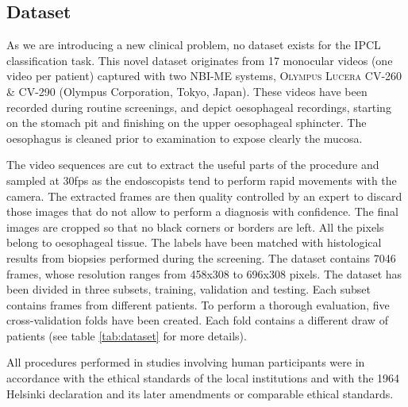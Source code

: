 \documentclass[runningheads]{llncs}
\begin{document}
\subsection{Dataset}

As we are introducing a new clinical problem, no dataset exists for the IPCL classification task. This novel dataset originates from 17 monocular videos (one video per patient) captured with two NBI-ME systems, \textsc{Olympus Lucera CV-260 \& CV-290} (Olympus Corporation, Tokyo, Japan). These videos have been recorded during routine screenings, and depict oesophageal recordings, starting on the stomach pit and finishing on the upper oesophageal sphincter. The oesophagus is cleaned prior to examination to expose clearly the mucosa.

The video sequences are cut to extract the useful parts of the procedure and sampled at 30fps as the endoscopists tend to perform rapid movements with the camera. The extracted frames are then quality controlled by an expert to discard those images that do not allow to perform a diagnosis with confidence. The final images are cropped so that no black corners or borders are left. All the pixels belong to oesophageal tissue. The labels have been matched with histological results from biopsies performed during the screening. The dataset contains 7046 frames, whose resolution ranges from 458x308 to 696x308 pixels. The dataset has been divided in three subsets, training, validation and testing. Each subset contains frames from different patients. To perform a thorough evaluation, five cross-validation folds have been created. Each fold contains a different draw of patients (see table \ref{tab:dataset} for more details). 

All procedures performed in studies involving human participants were in accordance with the ethical standards of the local institutions and with the 1964 Helsinki declaration and its later amendments or comparable ethical standards. %
\end{document}
